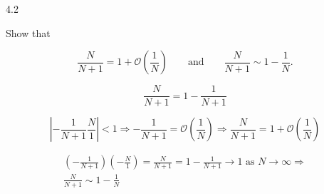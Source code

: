 \documentclass[12pt]{article}
\begin{document}
4.2

Show that

\begin{equation}
\frac{N}{N + 1} = 1 + \mathcal{O}\left(\frac{1}{N}\right) \qquad \text{and}
\qquad \frac{N}{N + 1} \sim 1 - \frac{1}{N}. \nonumber
\end{equation}

\begin{equation}
\frac{N}{N + 1} = 1 - \frac{1}{N + 1} \nonumber
\end{equation}

\begin{equation}
\left|- \frac{1}{N + 1} \frac{N}{1} \right| < 1 \Rightarrow -\frac{1}{N + 1} =
\mathcal{O}\left(\frac{1}{N}\right) \Rightarrow \frac{N}{N + 1} =
1 + \mathcal{O}\left(\frac{1}{N}\right)\nonumber
\end{equation}

\begin{equation}
\begin{split}
\left(-\frac{1}{N + 1}\right)\left(-\frac{N}{1}\right) = \frac{N}{N + 1} =
1 - \frac{1}{N + 1} \rightarrow 1 \text{ as } N \rightarrow \infty \Rightarrow\\
\frac{N}{N + 1} \sim 1 - \frac{1}{N}
\nonumber
\end{split}
\end{equation}
\end{document}
